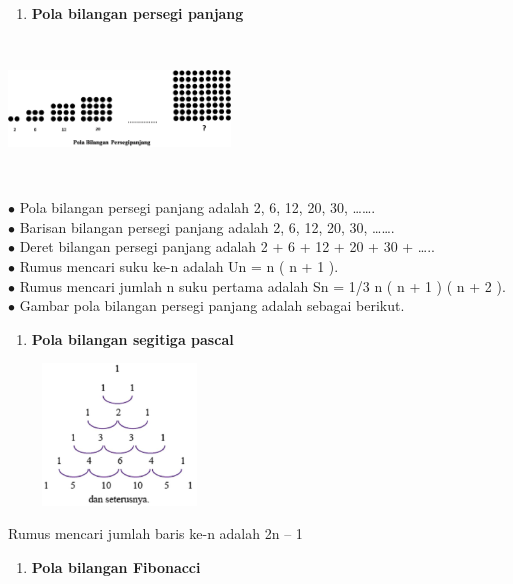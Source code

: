 \documentclass[11pt,fleqn]{book} %
\begin{document}
\noindent
\begin{enumerate}
	\item  \textbf{ Pola bilangan persegi panjang}
\end{enumerate}
\noindent
\begin{center}
	\noindent \includegraphics*[width=2.32in, height=1.48in, keepaspectratio=false, trim=0.00in 0.11in 0.00in 0.00in]{Pictures/25.PNG}
\end{center}
\noindent
\noindent  $\bullet$ Pola bilangan persegi panjang adalah 2, 6, 12, 20, 30, …….\\
\noindent  $\bullet$ Barisan bilangan persegi panjang adalah 2, 6, 12, 20, 30, …….\\
\noindent $\bullet$  Deret bilangan persegi panjang adalah 2 + 6 + 12 + 20 + 30 + …..\\
\noindent  $\bullet$ Rumus mencari suku ke-n adalah Un = n ( n + 1 ).\\
\noindent $\bullet$  Rumus mencari jumlah n suku pertama adalah Sn = 1/3 n ( n + 1 ) ( n + 2 ).\\
\noindent $\bullet$  Gambar pola bilangan persegi panjang adalah sebagai berikut.\\
\noindent
\begin{enumerate}
	\item  \textbf{ Pola bilangan segitiga pascal}
\end{enumerate}
\noindent
\begin{center}
	\noindent \includegraphics*[width=2.32in, height=1.48in, keepaspectratio=false, trim=0.00in 0.11in 0.00in 0.00in]{Pictures/26.PNG}
\end{center}
\noindent
\noindent Rumus mencari jumlah baris ke-n adalah 2n – 1
\\
\begin{enumerate}
	\item  \textbf{  Pola bilangan Fibonacci}
\end{enumerate}
\end{document}
